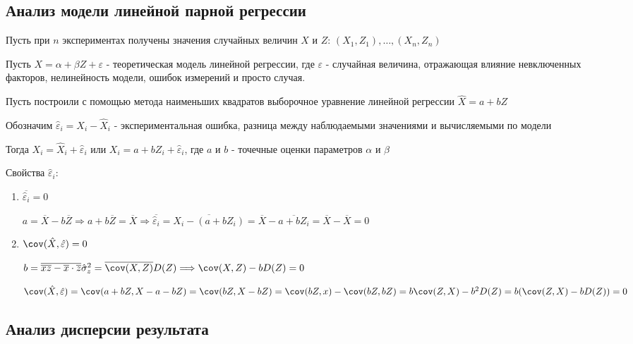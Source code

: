 \subsection{Анализ модели линейной парной регрессии}

Пусть при $n$ экспериментах получены значения случайных величин $X$ и $Z$: $(X_1, Z_1), \dots, (X_n, Z_n)$

Пусть $X = \alpha + \beta Z + \varepsilon$ - теоретическая модель линейной регрессии, где $\varepsilon$ - случайная величина,
отражающая влияние невключенных факторов, нелинейность модели, ошибок измерений и просто случая.

Пусть построили с помощью метода наименьших квадратов выборочное уравнение линейной регрессии $\hat X = a + b Z$

Обозначим $\hat \varepsilon_i = X_i - \hat X_i$ - экспериментальная ошибка, разница между наблюдаемыми значениями и 
вычисляемыми по модели

Тогда $X_i = \hat X_i + \hat \varepsilon_i$ или $X_i = a + b Z_i + \hat \varepsilon_i$, где $a$ и $b$ - точечные оценки параметров $\alpha$ и $\beta$

Свойства $\hat \varepsilon_i$:

\begin{enumerate}
    \item $\overline{\hat \varepsilon_i} = 0$

    \begin{MyProof}
        $a = \overline{X} - b \overline{Z} \Longrightarrow a + b \overline{Z} = \overline{X} \Longrightarrow \overline{\hat \varepsilon_i} = \overline{X_i - (a + b Z_i)} = \overline{X} - \overline{a + b Z_i} = \overline{X} - \overline{X} = 0$
    \end{MyProof}

    \item $\cov (\hat X, \hat \varepsilon) = 0$

    \begin{MyProof}
        $b = \overline{\overline{xz} - \overline{x} \cdot \overline{z}}{\hat \sigma^2_z} = \overline{\cov (X, Z)}{D(Z)} \Longrightarrow \cov (X, Z) - b D(Z) = 0$

        $\cov (\hat X, \hat \varepsilon) = \cov (a + b Z, X - a - bZ) = \cov (bZ, X - bZ) = \cov (bZ, x) - \cov (bZ, bZ) = b \cov (Z, X) - b^2 D(Z) = b (\cov (Z, X) - b D(Z)) = 0$
    \end{MyProof}
\end{enumerate}

\subsection{Анализ дисперсии результата}

